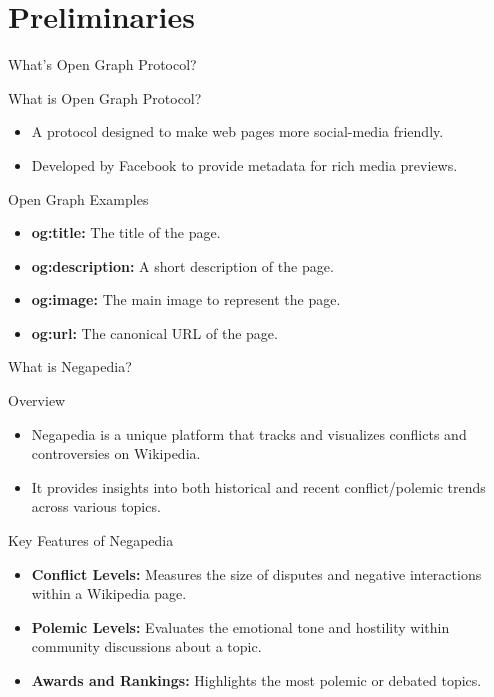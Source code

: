 \documentclass{beamer}
\begin{document}
\section{Preliminaries}
    \begin{frame}{What's Open Graph Protocol?}
        \begin{block}{What is Open Graph Protocol?}
        \begin{itemize}
            \item A protocol designed to make web pages more social-media friendly.
            \item Developed by Facebook to provide metadata for rich media previews.
        \end{itemize}
        \end{block}

        \begin{exampleblock}{Open Graph Examples}
            \begin{itemize}
                \item \textbf{og:title:} The title of the page.
                \item \textbf{og:description:} A short description of the page.
                \item \textbf{og:image:} The main image to represent the page.
                \item \textbf{og:url:} The canonical URL of the page.
            \end{itemize}
        \end{exampleblock}
    \end{frame}

    \begin{frame}{What is Negapedia?}
        \begin{block}{Overview}
            \begin{itemize}
                \item Negapedia is a unique platform that tracks and visualizes conflicts and controversies on Wikipedia.
                \item It provides insights into both historical and recent conflict/polemic trends across various topics.
            \end{itemize}
        \end{block}

        \begin{exampleblock}{Key Features of Negapedia}
            \begin{itemize}
                \item \textbf{Conflict Levels:} Measures the size of disputes and negative interactions within a Wikipedia page.
                \item \textbf{Polemic Levels:} Evaluates the emotional tone and hostility within community discussions about a topic.
                \item \textbf{Awards and Rankings:} Highlights the most polemic or debated topics.
            \end{itemize}
        \end{exampleblock}
    \end{frame}
\end{document}
